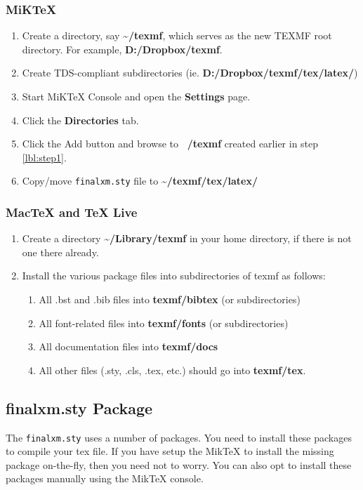 \documentclass[12pt]{article}
\begin{document}
\subsubsection{MiKTeX}
\begin{enumerate}[topsep=0pt, parsep=0pt]
	\item \label{lbl:step1} Create a directory, say \textbf{\textasciitilde/texmf}, which serves as the new TEXMF root directory. For example, \textbf{D:/Dropbox/texmf}.	
	\item Create TDS-compliant subdirectories (ie. \textbf{D:/Dropbox/texmf/tex/latex/}) 
	\item Start MiKTeX Console and open the \textbf{Settings} page.
	\item Click the \textbf{Directories} tab.
	\item Click the Add button and browse to \textbf{~/texmf} created earlier in step \ref{lbl:step1}.
	\item Copy/move \verb|finalxm.sty| file to \textbf{\textasciitilde/texmf/tex/latex/}
\end{enumerate}

\subsubsection{MacTeX and TeX Live}
\begin{enumerate}[topsep=0pt, parsep=0pt]
	\item Create a directory \textbf{\textasciitilde/Library/texmf} in your home directory, if there is not one there already.	
	\item Install the various package files into subdirectories of texmf as follows:
	\begin{enumerate}
		\item All .bst and .bib files into \textbf{texmf/bibtex} (or subdirectories)
		\item All font-related files into \textbf{texmf/fonts} (or subdirectories)
		\item All documentation files into \textbf{texmf/docs}
		\item All other files (.sty, .cls, .tex, etc.) should go into \textbf{texmf/tex}.		
	\end{enumerate}
\end{enumerate}

\subsection{finalxm.sty Package}\label{package}
The \verb|finalxm.sty| uses a number of packages. You need to install these packages to compile your tex file. If you have setup the MikTeX to install the missing package on-the-fly, then you need not to worry. You can also opt to install these packages manually using the MikTeX console. 
\end{document}
